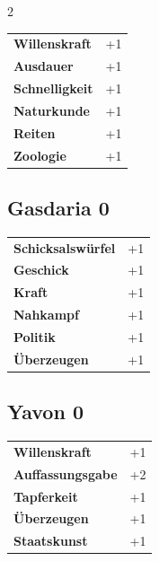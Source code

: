 \begin{multicols}{2}
\begin{tcolorbox}
\begin{tabular}{@{}ll@{}}
    \textbf{Willenskraft} & +1\\
    \textbf{Ausdauer} & +1\\
    \textbf{Schnelligkeit} & +1\\
    \textbf{Naturkunde} & +1\\
    \textbf{Reiten} & +1\\
    \textbf{Zoologie} & +1\\
\end{tabular}


\end{tcolorbox}

\begin{tcolorbox}
    \subsection*{Gasdaria \hfill \small{0 }}
    \tcblower




\begin{tabular}{@{}ll@{}}
    \textbf{Schicksalswürfel} & +1\\
    \textbf{Geschick} & +1\\
    \textbf{Kraft} & +1\\
    \textbf{Nahkampf} & +1\\
    \textbf{Politik} & +1\\
    \textbf{Überzeugen} & +1\\
\end{tabular}


\end{tcolorbox}

\begin{tcolorbox}
    \subsection*{Yavon \hfill \small{0 }}
    \tcblower




\begin{tabular}{@{}ll@{}}
    \textbf{Willenskraft} & +1\\
    \textbf{Auffassungsgabe} & +2\\
    \textbf{Tapferkeit} & +1\\
    \textbf{Überzeugen} & +1\\
    \textbf{Staatskunst} & +1\\
\end{tabular}


\end{tcolorbox}
\end{multicols}
